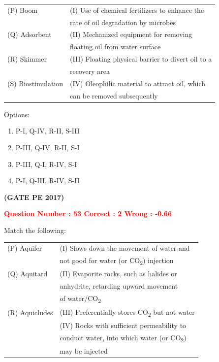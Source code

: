\documentclass[journal,12pt,onecolumn]{article}
\begin{document}
{\begin{tabular}{ll}
(P) Boom          & (I) Use of chemical fertilizers to enhance the \\
                  & \hfill rate of oil degradation by microbes \\
(Q) Adsorbent     & (II) Mechanized equipment for removing \\
                  & \hfill floating oil from water surface \\
(R) Skimmer       & (III) Floating physical barrier to divert oil to a \\
                  & \hfill recovery area \\
(S) Biostimulation & (IV) Oleophilic material to attract oil, which \\
                  & \hfill can be removed subsequently \\
\end{tabular}


Options:
\begin{enumerate}[label=(\Alph*)]
    \item P-I, Q-IV, R-II, S-III  
    \item P-III, Q-IV, R-II, S-I  
    \item P-III, Q-I, R-IV, S-I  
    \item P-I, Q-III, R-IV, S-II  
\end{enumerate}

\hfill\textbf{(GATE PE 2017)}\\[0.6cm]

\newpage

\textcolor{red}{\textbf{Question Number : 53 \hfill Correct : 2  Wrong : -0.66}}



Match the following:\\[0.6cm]


\begin{tabular}{ll}
(P) Aquifer     & (I) Slows down the movement of water and \\
                & \hfill not good for water (or CO\textsubscript{2}) injection \\
(Q) Aquitard    & (II) Evaporite rocks, such as halides or \\
                & \hfill anhydrite, retarding upward movement \\
                & \hfill of water/CO\textsubscript{2} \\
(R) Aquicludes  & (III) Preferentially stores CO\textsubscript{2} but not water \\
                & (IV) Rocks with sufficient permeability to \\
                & \hfill conduct water, into which water (or CO\textsubscript{2}) \\
                & \hfill may be injected \\
\end{tabular}

}
\end{document}
